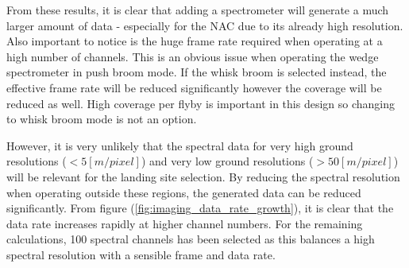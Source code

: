 From these results, it is clear that adding a spectrometer will generate a much larger amount of data - especially for the NAC due to its already high resolution. Also important to notice is the huge frame rate required when operating at a high number of channels. This is an obvious issue when operating the wedge spectrometer in push broom mode. If the whisk broom is selected instead, the effective frame rate will be reduced significantly however the coverage will be reduced as well. High coverage per flyby is important in this design so changing to whisk broom mode is not an option.

However, it is very unlikely that the spectral data for very high ground resolutions ($<5[m/pixel]$) and very low ground resolutions ($>50[m/pixel]$) will be relevant for the landing site selection. By reducing the spectral resolution when operating outside these regions, the generated data can be reduced significantly. From figure (\ref{fig:imaging_data_rate_growth}), it is clear that the data rate increases rapidly at higher channel numbers. For the remaining calculations, 100 spectral channels has been selected as this balances a high spectral resolution with a sensible frame and data rate.
\begin{table}[htb!]
  \centering
  \caption{The rate growth for the WAC, when optimal spectral resolution is selected.}
  \label{tab:opt_rate_growth_wac}%
\end{table}%
